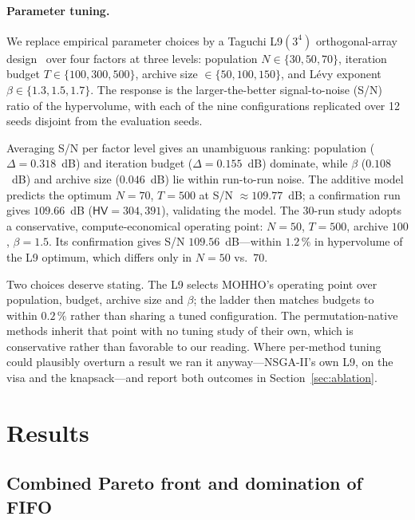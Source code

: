 \documentclass[runningheads]{llncs}
\newcommand{\HV}{\textsf{HV}}
\begin{document}
\paragraph{Parameter tuning.}
\label{sec:taguchi}%
We replace empirical parameter choices by a Taguchi L9$(3^4)$ orthogonal-array design~\cite{alrafei,montgomery} over four factors at three levels: population $N\in\{30,50,70\}$, iteration budget $T\in\{100,300,500\}$, archive size $\in\{50,100,150\}$, and L\'evy exponent $\beta\in\{1.3,1.5,1.7\}$. The response is the larger-the-better signal-to-noise (S/N) ratio of the hypervolume, with each of the nine configurations replicated over 12 seeds disjoint from the evaluation seeds.

Averaging S/N per factor level gives an unambiguous ranking: population ($\Delta=0.318$~dB) and iteration budget ($\Delta=0.155$~dB) dominate, while $\beta$ ($0.108$~dB) and archive size ($0.046$~dB) lie within run-to-run noise. The additive model predicts the optimum $N{=}70$, $T{=}500$ at S/N $\approx109.77$~dB; a confirmation run gives $109.66$~dB ($\HV=304{,}391$), validating the model. The 30-run study adopts a conservative, compute-economical operating point: $N{=}50$, $T{=}500$, archive $100$, $\beta{=}1.5$. Its confirmation gives S/N $109.56$~dB---within $1.2\,\%$ in hypervolume of the L9 optimum, which differs only in $N{=}50$ vs.\ $70$.

Two choices deserve stating. The L9 selects MOHHO's operating point over population, budget, archive size and $\beta$; the ladder then matches budgets to within $0.2\,\%$ rather than sharing a tuned configuration. The permutation-native methods inherit that point with no tuning study of their own, which is conservative rather than favorable to our reading. Where per-method tuning could plausibly overturn a result we ran it anyway---NSGA-II's own L9, on the visa and the knapsack---and report both outcomes in Section~\ref{sec:ablation}.

\section{Results}
\label{sec:results}

\subsection{Combined Pareto front and domination of FIFO}
\label{sec:front}
\end{document}
